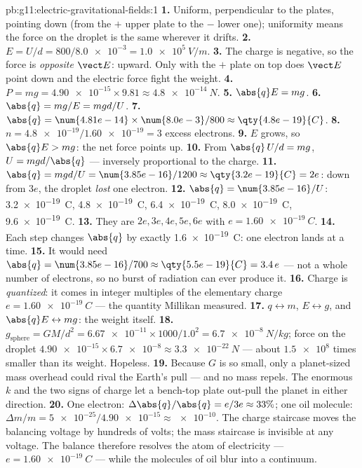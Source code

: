 \begin{solution}{pb:g11:electric-gravitational-fields:1}
\textbf{1.} Uniform, perpendicular to the plates, pointing down (from
the $+$ upper plate to the $-$ lower one); uniformity means the force
on the droplet is the same wherever it drifts.
\textbf{2.} $E = U/d = 800 / \num{8.0e-3} = \qty{1.0e5}{V/m}$.
\textbf{3.} The charge is negative, so the force is \emph{opposite}
$\vect E$: upward. Only with the $+$ plate on top does $\vect E$ point
down and the electric force fight the weight.
\textbf{4.} $P = mg = \num{4.90e-15} \times 9.81 \approx
\qty{4.8e-14}{N}$.
\textbf{5.} $\abs{q}E = mg$.
\textbf{6.} $\abs{q} = mg/E = mgd/U$.
\textbf{7.} $\abs{q} = \num{4.81e-14} \times \num{8.0e-3} / 800
\approx \qty{4.8e-19}{C}$.
\textbf{8.} $n = \num{4.8e-19} / \num{1.60e-19} = 3$ excess electrons.
\textbf{9.} $E$ grows, so $\abs{q}E > mg$: the net force points up.
\textbf{10.} From $\abs{q}\,U/d = mg$, $U = mgd/\abs{q}$ --- inversely
proportional to the charge.
\textbf{11.} $\abs{q} = mgd/U = \num{3.85e-16}/1200 \approx
\qty{3.2e-19}{C} = 2e$: down from $3e$, the droplet \emph{lost} one
electron.
\textbf{12.} $\abs{q} = \num{3.85e-16}/U$: \qty{3.2e-19}{C},
\qty{4.8e-19}{C}, \qty{6.4e-19}{C}, \qty{8.0e-19}{C},
\qty{9.6e-19}{C}.
\textbf{13.} They are $2e, 3e, 4e, 5e, 6e$ with
$e = \qty{1.60e-19}{C}$.
\textbf{14.} Each step changes $\abs{q}$ by exactly
\qty{1.6e-19}{C}: one electron lands at a time.
\textbf{15.} It would need $\abs{q} = \num{3.85e-16}/700 \approx
\qty{5.5e-19}{C} = 3.4\,e$ --- not a whole number of electrons, so no
burst of radiation can ever produce it.
\textbf{16.} Charge is \emph{quantized}: it comes in integer multiples
of the elementary charge $e = \qty{1.60e-19}{C}$ --- the quantity
Millikan measured.
\textbf{17.} $q \leftrightarrow m$, $E \leftrightarrow g$, and
$\abs{q}E \leftrightarrow mg$: the weight itself.
\textbf{18.} $g_{\text{sphere}} = GM/d^2 = \num{6.67e-11} \times 1000 /
1.0^2 = \qty{6.7e-8}{N/kg}$; force on the droplet
$\num{4.90e-15} \times \num{6.7e-8} \approx \qty{3.3e-22}{N}$ --- about
$\num{1.5e8}$ times smaller than its weight. Hopeless.
\textbf{19.} Because $G$ is so small, only a planet-sized mass overhead
could rival the Earth's pull --- and no mass repels. The enormous $k$
and the two signs of charge let a bench-top plate out-pull the planet
in either direction.
\textbf{20.} One electron: $\Delta\abs{q}/\abs{q} = e/3e \approx 33\%$;
one oil molecule: $\Delta m/m = \num{5e-25} / \num{4.90e-15}
\approx \num{e-10}$. The charge staircase moves the balancing voltage
by hundreds of volts; the mass staircase is invisible at any voltage.
The balance therefore resolves the atom of electricity ---
$e = \qty{1.60e-19}{C}$ --- while the molecules of oil blur into a
continuum.
\end{solution}
